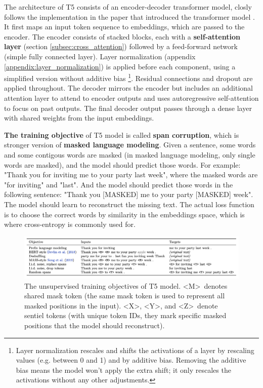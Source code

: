 The architecture of T5 consists of an encoder-decoder transformer model, closly follows the implementation in the paper that introduced the transformer model \cite{transformer}. It first maps an input token sequence to embeddings, which are passed to the encoder. The encoder consists of stacked blocks, each with a \textbf{self-attention layer} (section \ref{subsec:cross_attention}) followed by a feed-forward network (simple fully connected layer). Layer normalization (appendix \ref{appendix:layer_normalization}) is applied before each component, using a simplified version without additive bias \footnote{Layer normalization rescales and shifts the activations of a layer by rescaling values (e.g. between 0 and 1) and by additive bias. Removing the additive bias means the model won't apply the extra shift; it only rescales the activations without any other adjustments.}. Residual connections and dropout are applied throughout. The decoder mirrors the encoder but includes an additional attention layer to attend to encoder outputs and uses autoregressive self-attention to focus on past outputs. The final decoder output passes through a dense layer with shared weights from the input embeddings. 

\textbf{The training objective} of T5 model is called \textbf{span corruption}, which is stronger version of \textbf{masked language modeling}. Given a sentence, some words and some contigous words are masked (in masked language modeling, only single words are masked), and the model should predict those words. For example: "Thank you for inviting me to your party last week", where the masked words are "for inviting" and "last". And the model should predict those words in the following sentence: "Thank you [MASKED] me to your party [MASKED] week". The model should learn to reconstruct the missing text. The actual loss function is to choose the correct words by similarity in the embeddings space, which is where cross-entropy is commonly used for.

\begin{figure}[h]
    \centering
    \includegraphics[width=1\textwidth]{images/imagen/t5_objectives.png}
    \caption{The unsupervised training objectives of T5 model. \textless M\textgreater\ denotes shared mask token (the same mask token is used to represent all masked positions in the input). \textless X\textgreater, \textless Y\textgreater, and \textless Z\textgreater\ denote sentiel tokens (with unique token IDs, they mark specific masked positions that the model should reconstruct).}
\end{figure}

